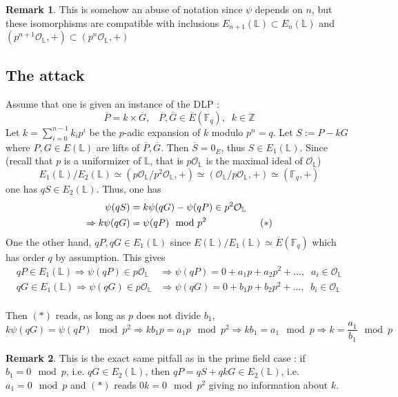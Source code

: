 \documentclass[10pt]{article}
\theoremstyle{definition}
\newtheorem{remark}{Remark}
\newcommand{\F}{\mathbb{F}}
\renewcommand{\L}{\mathbb{L}}
\newcommand{\Z}{\mathbb{Z}}
\begin{document}
\begin{remark}
This is somehow an abuse of notation since $\psi$ depends on $n$, but these isomorphisms are compatible with inclusions $E_{n+1}(\L) \subset E_n(\L)$ and $(p^{n+1}\mathcal{O}_{\L},+) \subset (p^n\mathcal{O}_{\L},+)$ 
\end{remark}

\subsection{The attack}

\noindent Assume that one is given an instance of the DLP : 
\[ \overline{P} = k \times \overline{G}, \; \; \;  \overline{P}, \overline{G} \in \overline{E}(\F_q), \; \; k \in \Z \]
Let $k = \sum_{i = 0}^{n-1} k_i p^i$ be the $p$-adic expansion of $k$ modulo $p^n = q$.
Let $S := P-kG$ where $P,G \in E(\L)$ are lifts of $\overline{P},\overline{G}$.
Then $\overline{S} = 0_{\overline{E}}$, thus $S \in E_1(\L)$.
Since (recall that $p$ is a uniformizer of $\L$, that is $p\mathcal{O}_{\L}$ is the maximal ideal of $\mathcal{O}_{\L}$)
\[E_1(\L) /E_2(\L) \simeq (p\mathcal{O}_{\L}/ p^2\mathcal{O}_{\L},+) \simeq (\mathcal{O}_{\L}/p\mathcal{O}_{\L},+) \simeq (\F_q,+)\]
one has $qS \in E_2(\L)$.
Thus, one has
\begin{align*} \psi(qS) &= k  \psi(qG) - \psi(qP) \in p^2\mathcal{O}_{\L} \\
 \Rightarrow k\psi(qG) &= \psi(qP) \mod p^2  \mkern100mu(*) \end{align*}
One the other hand, $qP, qG \in E_1(\L)$ since $E(\L) / E_1(\L) \simeq \overline{E}(\F_q)$ which has order $q$ by assumption.
This gives 
\begin{align*}
qP \in E_1(\L) \Rightarrow \psi(qP) \in p\mathcal{O}_{\L} &\Rightarrow \psi(qP) = 0 + a_1p+ a_2p^2+ \dots, \; \; a_i \in \mathcal{O}_{\L} \\
qG \in E_1(\L) \Rightarrow \psi(qG) \in p\mathcal{O}_{\L} &\Rightarrow \psi(qG) = 0 + b_1p+ b_2p^2+ \dots, \; \; b_i \in \mathcal{O}_{\L} \\
\end{align*}

Then $(*)$ reads, as long as $p$ does not divide $b_1$,
\[ k\psi(qG) = \psi(qP) \mod p^2 \Rightarrow kb_1p = a_1p \mod p^2 \Rightarrow kb_1 = a_1 \mod p \Rightarrow k = \frac{a_1}{b_1} \mod p \]

\begin{remark}
This is the exact same pitfall as in the prime field case : if $b_1 = 0 \mod p$, i.e. $qG \in E_2(\L)$, then $qP = qS + qkG \in E_2(\L)$, i.e. $a_1 = 0 \mod p$ and $(*)$ reads $0k = 0 \mod p^2$ giving no information about $k$.
\end{remark}
\end{document}
